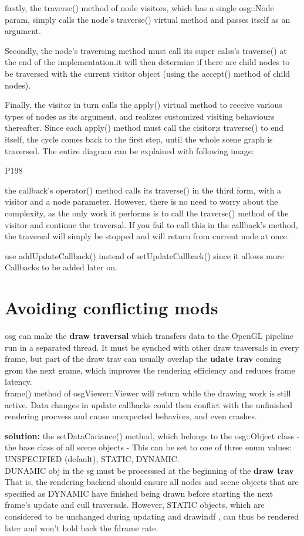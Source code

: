 \documentclass[a4paper,12pt]{book}
\begin{document}
firstly, the traverse() method of node visitors, which has a single osg::Node param, simply calls the node's traverse() virtual method and passes itself as an argument.

Secondly, the node's traversing method must call its super calss's traverse() at the end of the implementation.it will then determine if there are child nodes to be traversed with the current visitor object (using the accept() method of child nodes).

Finally, the visitor in turn calls the apply() virtual method to receive various types of nodes as its argument, and realizes customized visiting behaviours thereafter. Since each apply() method must call the cisitor;s traverse() to end itself, the cycle comes back to the first step, until the whole scene graph is traversed. The entire diagram can be explained with following image:

P198

the callback's operator() method calls its traverse() in the third form, with a visitor and a node parameter. However, there is no need to worry about the complexity, as the only work it performs is to call the traverse() method of the visitor and continue the traversal. If you fail to call this in the callback's method, the traversal will simply be stopped and will return from current node at once.

\textrightarrow use addUpdateCallback() instead of setUpdateCallback() since it allows more Callbacks to be added later on.

\section{Avoiding conflicting mods}
osg can make the \textbf{draw traversal} which transfers data to the OpenGL pipeline run in a separated thread. It must be synched with other draw traversals in every frame, but part of the draw trav can usually overlap the \textbf{udate trav} coming grom the next grame, which improves the rendering efficiency and reduces frame latency.\\
\textrightarrow frame() method of osgViewer::Viewer will return while the drawing work is still active. Data changes in update callbacks could then conflict with the unfinished rendering procvess and cause unexpected behaviors, and even crashes.

\textbf{solution:}
the setDataCariance() method, which belongs to the osg::Object class - the base class of all scene objects - This can be set to one of three enum values: UNSPECIFIED (default), STATIC, DYNAMIC.\\
\textrightarrow DUNAMIC obj in the sg must be processsed at the beginning of the \textbf{draw trav} That is, the rendering backend should ensure all nodes and scene objects that are specified as DYNAMIC have finished being drawn before starting the next frame's update and cull traversals.
However, STATIC objects, which are considered to be unchanged during updating and drawindf , can thus be rendered later and won't hold back the fdrame rate.
\end{document}
